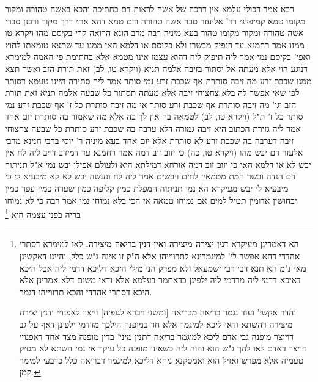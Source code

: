 \documentclass[12pt, openany]{book}
\newcommand{\footnotecomment}[1]{\footnote{#1}}
\newcommand{\commenta}[1]{\footnotecomment{#1}}
\begin{document}
{רבא אמר  דכולי עלמא אין דרכה של אשה לראות דם בחתיכה
והכא באשה טהורה ומקור מקומו טמא קמיפלגי  דר' אליעזר סבר  אשה טהורה ודם טמא דהא אתי דרך מקור  ורבנן סברי  אשה טהורה ומקור מקומו טהור 
בעא מיניה רבה מרב הונא  הרואה קרי בקיסם מהו  {ויקרא טו } ממנו אמר רחמנא עד דנפיק מבשרו ולא בקיסם  או דלמא האי ממנו עד שתצא טומאתו לחוץ ואפי' בקיסם נמי 
אמר ליה  תיפוק ליה דהוא עצמו אינו מטמא אלא בחתימת פי האמה
למימרא דנוגע הוי  אלא מעתה אל יסתור בזיבה 
אלמה תניא  (ויקרא טו, לב) זאת תורת הזב ואשר תצא ממנו שכבת זרע מה זיבה סותרת אף שכבת זרע נמי סותר 
אמר ליה  סתירה היינו טעמא דסותר לפי שאי אפשר לה בלא צחצוחי זיבה 
אלא מעתה תסתור כל שבעה  אלמה תניא  זאת תורת הזב וגו' מה זיבה סותרת אף שכבת זרע סותר
אי מה זיבה סותרת כל ז' אף שכבת זרע נמי סותר כל ז'  ת"ל (ויקרא טו, לב) לטמאה בה אין לך בה אלא מה שאמור בה סותרת יום אחד 
אמר ליה  גזירת הכתוב היא זיבה גמורה דלא ערבה בה שכבת זרע סותרת כל שבעה צחצוחי זיבה דערבה בה שכבת זרע לא סותרת אלא יום אחד 
בעא מיניה ר' יוסי ברבי חנינא מרבי אלעזר  דם יבש מהו  (ויקרא טו, כה) כי יזוב זוב דמה אמר רחמנא עד דמידב דייב ליה לח אין יבש לא או דלמא  האי כי יזוב זוב דמה אורחא דמילתא היא ולעולם אפילו יבש נמי 
א"ל  תניתוה דם הנדה ובשר המת מטמאין לחים ויבשים  אמר ליה  לח ונעשה יבש לא קא מיבעיא לי כי מיבעיא לי יבש מעיקרא 
הא נמי תניתוה  המפלת כמין קליפה כמין שערה כמין עפר כמין יבחושין אדומין תטיל למים
אם נמוחו טמאה  אי הכי בלא נמוחו נמי  אמר רבה  כי לא נמוחו בריה בפני עצמה היא 
\commenta{הא דאמרינן מעיקרא \textbf{דנין יצירה מיצירה ואין דנין בריאה מיצירה.}  לאו למימרא דסתרי אהדדי דהא אפשר לי' למיגמרינא לתרווייהו אלא ה"ק זו אינה ג"ש כלל, והיינו דאקשינן מאי נ"מ הא תנא דבי רבי ישמעאל ולא מפרק הני מילי היכא דליכא דדמי ליה אבל היכא דאיכא דדמי ליה מדדמי ליה ילפינן כדאתמר בעלמא אלא ודאי משום דלא אמרינן אלא היכא דסתרי אהדדי והכא תרווייהו דגמר.\par  והדר אקשי' ועוד נגמר בריאה מבריאה [ומשני ויברא לגופיה] וייצר לאפנויי ודנין יצירה מיצירה דהשתא ודאי ליכא למיגמר אלא חד במופנה הילכך מדדמי ילפינן דאף על גב דוייצר מופנה גבי אדם ליכא למיגמר בריאה דתנין מיני' בדין מופנה מצד אחד דאפנויי דויצר דאדם לאו להך ג"ש הוא והוה ליה כשאינו מופנה כל עיקר אי נמי השתא לא מסיק טעמיה אלא מפרש ואזיל הוא ואמסקנא ניחא דליכא למיגמר דבריאה כלל כדבעי למימר קמן. }

}
\end{document}
